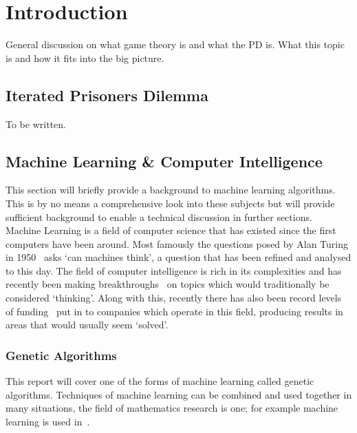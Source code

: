 
\chapter{Introduction}\label{ch:intro}

General discussion on what game theory is and what the PD is.
What this topic is and how it fits into the big picture.\\

\section{Iterated Prisoners Dilemma}\label{sec:iteratedPrisonersDilemma}
To be written.
\section{Machine Learning \& Computer Intelligence}\label{sec:machineLearningAndcomputerIntelligence}
This section will briefly provide a background to machine learning algorithms.
This is by no means a comprehensive look into these subjects but will provide sufficient background to enable a technical discussion in further sections.\\

Machine Learning is a field of computer science that has existed since the first computers have been around.
Most famously the questions posed by Alan Turing in 1950~\cite{turing1950computing} asks `can machines think', a question that has been refined and analysed to this day.
The field of computer intelligence is rich in its complexities and has recently been making breakthroughs~\cite{knight2017alphaZeroMIT} on topics which would traditionally be considered `thinking'.
Along with this, recently there has also been record levels of funding~\cite{chui2017artificial} put in to companies which operate in this field, producing results in areas that would usually seem `solved'.\\

\subsection{Genetic Algorithms}\label{subsec:geneticAlgorithms}
This report will cover one of the forms of machine learning called genetic algorithms.
Techniques of machine learning can be combined and used together in many situations, the field of mathematics research is one;
for example machine learning is used in~\cite{chu1997genetic}.\\

